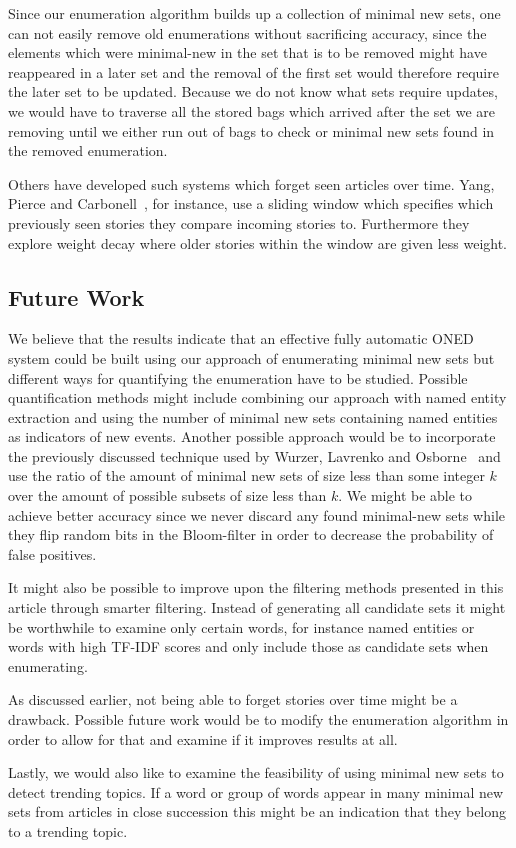 Since our enumeration algorithm builds up a collection of minimal new sets, one can not easily remove old enumerations without sacrificing accuracy, since the elements which were minimal-new in the set that is to be removed might have reappeared in a later set and the removal of the first set would therefore require the later set to be updated. Because we do not know what sets require updates, we would have to traverse all the stored bags which arrived after the set we are removing until we either run out of bags to check or minimal new sets found in the removed enumeration.

Others have developed such systems which forget seen articles over time. Yang, Pierce and Carbonell~\cite{yang1998study}, for instance, use a sliding window which specifies which previously seen stories they compare incoming stories to. Furthermore they explore weight decay where older stories within the window are given less weight.

\subsection{Future Work}
We believe that the results indicate that an effective fully automatic ONED system could be built using our approach of enumerating minimal new sets but different ways for quantifying the enumeration have to be studied. Possible quantification methods might include combining our approach with named entity extraction and using the number of minimal new sets containing named entities as indicators of new events. Another possible approach would be to incorporate the previously discussed technique used by Wurzer, Lavrenko and Osborne~\cite{wurzer2015kterm} and use the ratio of the amount of minimal new sets of size less than some integer $k$ over the amount of possible subsets of size less than $k$. We might be able to achieve better accuracy since we never discard any found minimal-new sets while they flip random bits in the Bloom-filter in order to decrease the probability of false positives.

It might also be possible to improve upon the filtering methods presented in this article through smarter filtering. Instead of generating all candidate sets it might be worthwhile to examine only certain words, for instance named entities or words with high TF-IDF scores and only include those as candidate sets when enumerating.

As discussed earlier, not being able to forget stories over time might be a drawback. Possible future work would be to modify the enumeration algorithm in order to allow for that and examine if it improves results at all.

Lastly, we would also like to examine the feasibility of using minimal new sets to detect trending topics. If a word or group of words appear in many minimal new sets from articles in close succession this might be an indication that they belong to a trending topic.
